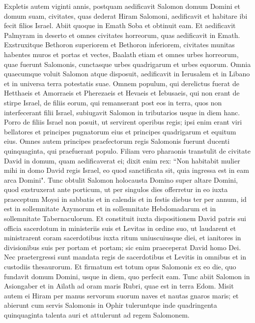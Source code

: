 \begin{biblechapter}  
\verse Expletis autem viginti annis, postquam aedificavit Salomon domum Domini et domum suam, 
\verse civitates, quas dederat Hiram Salomoni, aedificavit et habitare ibi fecit filios Israel. 
\verse Abiit quoque in Emath Soba et obtinuit eam. 
\verse Et aedificavit Palmyram in deserto et omnes civitates horreorum, quas aedificavit in Emath. 
\verse Exstruxitque Bethoron superiorem et Bethoron inferiorem, civitates munitas habentes muros et portas et vectes, 
\verse Baalath etiam et omnes urbes horreorum, quae fuerunt Salomonis, cunctasque urbes quadrigarum et urbes equorum. Omnia quaecumque voluit Salomon atque disposuit, aedificavit in Ierusalem et in Libano et in universa terra potestatis suae. 
\verse Omnem populum, qui derelictus fuerat de Hetthaeis et Amorraeis et Pherezaeis et Hevaeis et Iebusaeis, qui non erant de stirpe Israel, 
\verse de filiis eorum, qui remanserant post eos in terra, quos non interfecerant filii Israel, subiugavit Salomon in tributarios usque in diem hanc. 
\verse Porro de filiis Israel non posuit, ut servirent operibus regis; ipsi enim erant viri bellatores et principes pugnatorum eius et principes quadrigarum et equitum eius. 
\verse Omnes autem principes praefectorum regis Salomonis fuerunt ducenti quinquaginta, qui praefuerant populo. 
\verse Filiam vero pharaonis transtulit de civitate David in domum, quam aedificaverat ei; dixit enim rex: “Non habitabit mulier mihi in domo David regis Israel, eo quod sanctificata sit, quia ingressa est in eam arca Domini". 
\verse Tunc obtulit Salomon holocausta Domino super altare Domini, quod exstruxerat ante porticum, 
\verse ut per singulos dies offerretur in eo iuxta praeceptum Moysi in sabbatis et in calendis et in festis diebus ter per annum, id est in sollemnitate Azymorum et in sollemnitate Hebdomadarum et in sollemnitate Tabernaculorum. 
\verse Et constituit iuxta dispositionem David patris sui officia sacerdotum in ministeriis suis et Levitas in ordine suo, ut laudarent et ministrarent coram sacerdotibus iuxta ritum uniuscuiusque diei, et ianitores in divisionibus suis per portam et portam; sic enim praeceperat David homo Dei.  
\verse Nec praetergressi sunt mandata regis de sacerdotibus et Levitis in omnibus et in custodiis thesaurorum. 
\verse Et firmatum est totum opus Salomonis ex eo die, quo fundavit domum Domini, usque in diem, quo perfecit eam. 
\verse Tunc abiit Salomon in Asiongaber et in Ailath ad oram maris Rubri, quae est in terra Edom. 
\verse Misit autem ei Hiram per manus servorum suorum naves et nautas gnaros maris; et abierunt cum servis Salomonis in Ophir tuleruntque inde quadringenta quinquaginta talenta auri et attulerunt ad regem Salomonem. 
\end{biblechapter}

